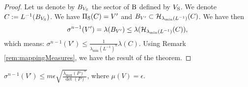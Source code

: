 \begin{proof}
Let us denote by $B_{V_{\text{S}}}$ the sector of $\text{B}$ defined by $V_{\text{S}}$. We denote $C:= L^{-1}(B_{V_{\text{S}}})$. We have $\Pi_{\text{S}}(C) = V'$ and $B_{V'} \subset \mathcal{H}_{\lambda_{\min}(L^{-1})}(C)$.  We have then 
$$\sigma^{n-1}(V') = \lambda(B_{V'}) \leq \lambda (\mathcal{H}_{\lambda_{\min}(L^{-1})}(C)),$$ which means: $\sigma^{n-1}(V') \leq \frac{1}{\lambda_{\min}(L^{-1})^n} \lambda(C)$. Using Remark \ref{rem:mappingMeasures}, we have the result of the theorem.





\end{proof}

\begin{corollary}$\sigma^{n-1}(V') \leq m\epsilon \sqrt{\frac{\lambda_{\max}(P)^n}{\det(P)}}$,
where $\mu(V) = \epsilon$.
\end{corollary}


